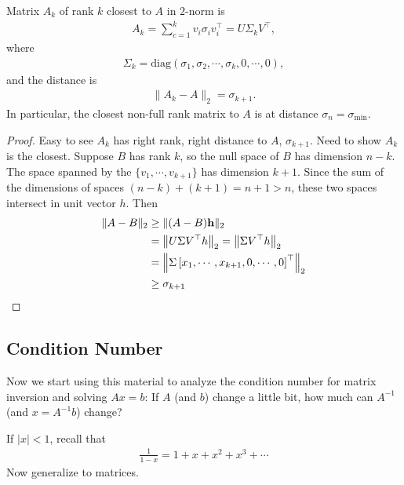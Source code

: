 \documentclass[11pt]{article}
\numberwithin{equation}{section}
\begin{document}
\begin{fact}
    Matrix $A_k$ of rank $k$ closest to $A$ in $2$-norm is \begin{align*}
        A_{k}=\sum_{c=1}^{k} v_{i} \sigma_{i} v_{i}^{\top}=U\Sigma_kV^\top ,
    \end{align*}
    where \begin{align*}
        \Sigma_k = \text{diag}\left(\sigma_1, \sigma_{2}, \cdots , \sigma_k, 0, \cdots,0\right),
    \end{align*}
    and the distance is \begin{align*}
        \|A_k -A\|_2=\sigma_{k+1}.
    \end{align*}
    In particular, the closest non-full rank matrix to $A$ is at distance $\sigma_n=\sigma_{\mathrm{min}}$.
    \begin{proof}
        Easy to see $A_k$ has right rank, right distance to $A$, $\sigma_{k+1}$. Need to show $A_k$ is the closest. Suppose $B$ has rank $k$, 
        so the null space of $B$ has dimension $n-k$. The space spanned by the $\{v_1,\cdots,v_{k+1}\}$ has dimension $k+1$.
        Since the sum of the dimensions of spaces $(n-k)+(k+1)=n+1>n$, these two spaces intersect in unit vector $h$. Then \begin{align*}
            \|A-B\|_{2} &\geq \|(A-B) \mathbf{h}\|_{2} \\
            &= \left\| U\Sigma V^\top h \right\|_2 = \left\| \Sigma V^\top h \right\|_2 \\
            &= \left\| \Sigma \left[ x_1, \cdots, x_{k+1}, 0, \cdots, 0 \right]^\top \right\|_2 \\
            &\geq \sigma_{k+1}
        \end{align*}
    \end{proof}
\end{fact}

\subsection{Condition Number}
Now we start using this material to analyze the condition number for matrix inversion and solving $Ax=b$: If $A$ (and $b$) change a little bit, 
how much can $A^{-1}$ (and $x=A^{-1} b$) change?

If $|x|<1$, recall that \begin{align*}
    \frac{1}{1-x}=1+x+x^{2}+x^{3}+\cdots
\end{align*}
Now generalize to matrices.
\end{document}
